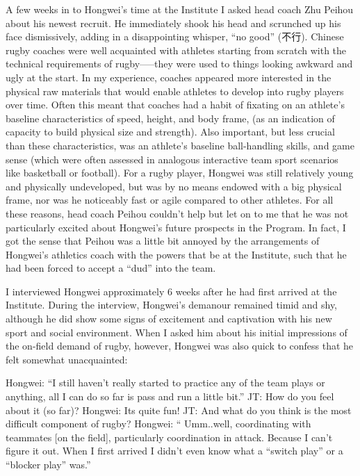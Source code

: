 A few weeks in to Hongwei’s time at the Institute I asked head coach Zhu Peihou about his newest recruit.  He immediately shook his head and scrunched up his face dismissively, adding in a disappointing whisper, ``no good'' (不行).  Chinese rugby coaches were well acquainted with athletes starting from scratch with the technical requirements of rugby—--they were used to things looking awkward and ugly at the start.  In my experience, coaches appeared more interested in the physical raw materials that would enable athletes to develop into rugby players over time.  Often this meant that coaches had a habit of fixating on an athlete's baseline characteristics of speed, height, and body frame, (as an indication of capacity to build physical size and strength).  Also important, but less crucial than these characteristics, was an athlete’s baseline ball-handling skills, and game sense (which were often assessed in analogous interactive team sport scenarios like basketball or football).  For a rugby player, Hongwei was still relatively young and physically undeveloped, but was by no means endowed with a big physical frame, nor was he noticeably fast or agile compared to other athletes.  For all these reasons, head coach Peihou couldn’t help but let on to me that he was not particularly excited about Hongwei's future prospects in the Program.  In fact, I got the sense that Peihou was a little bit annoyed by the arrangements of Hongwei’s athletics coach with the powers that be at the Institute, such that he had been forced to accept a ``dud'' into the team.



I interviewed Hongwei approximately 6 weeks after he had first arrived at the Institute.  During the interview, Hongwei's  demanour remained timid and shy, although he did show some signs of excitement and captivation with his new sport and social environment.  When I asked him about his initial impressions of the on-field demand of rugby, however, Hongwei was also quick to confess that he felt somewhat unacquainted:

Hongwei: ``I still haven’t really started to practice any of the team plays or anything, all I can do so far is pass and run a little bit.''
JT: How do you feel about it (so far)?
Hongwei: Its quite fun!
JT: And what do you think is the most difficult component of rugby?
Hongwei: `` Umm..well, coordinating with teammates [on the field], particularly coordination in attack.  Because I can't figure it out. When I first arrived I didn’t even know what a ``switch play'' or a ``blocker play'' was.''

